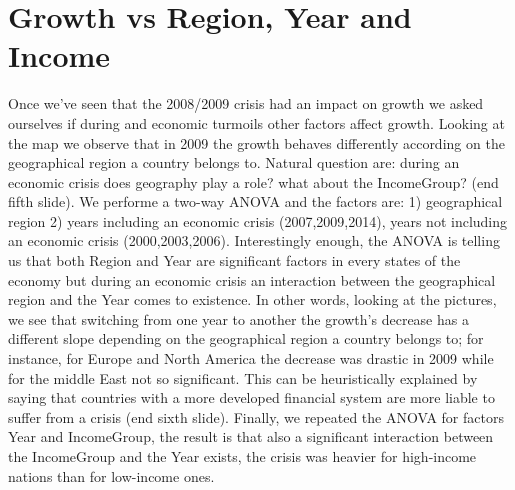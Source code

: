 \documentclass[12pt,twoside,a4paper]{article}
\begin{document}
	\section{Growth vs Region, Year and Income}
	Once we've seen that the 2008/2009 crisis had an impact on growth we asked ourselves if during and economic turmoils other factors affect growth. Looking at the map we observe that in 2009 the growth behaves differently according on the geographical region a country belongs to. Natural question are: during an economic crisis does geography play a role? what about the IncomeGroup? (end fifth slide). \newline
	We performe a two-way ANOVA and the factors are: 1) geographical region 2) years including an economic crisis (2007,2009,2014),
	years not including an economic crisis (2000,2003,2006).
	Interestingly enough, the ANOVA is telling us that both Region and Year are significant factors in every states of the economy but during an economic crisis an interaction between the geographical region and the Year comes to existence. In other words, looking at the pictures, we see that switching from one year to another the growth's decrease has a different slope depending on the geographical region a country belongs to; for instance, for Europe and North America the decrease was drastic in 2009 while for the middle East not so significant. This can be heuristically explained by saying that countries with a more developed financial system are more liable to suffer from a crisis (end sixth slide). \newline
	Finally, we repeated the ANOVA for factors Year and IncomeGroup, the result is that also a significant interaction between the IncomeGroup and the Year exists, the crisis was heavier for high-income nations than for low-income ones.
	
	
	
	
	
	
	
	
	
	
	
	
\end{document}

